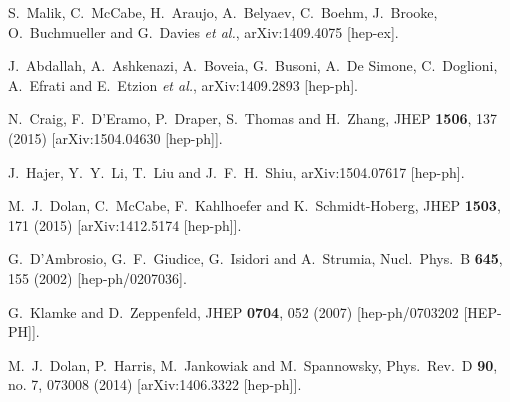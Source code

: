 \documentclass[preprintnumbers,superscriptaddress,nofootinbib,aps,prd,floatfix]{revtex4}
\begin{document}
\begin{thebibliography}{99}
  S.~Malik, C.~McCabe, H.~Araujo, A.~Belyaev, C.~Boehm, J.~Brooke, O.~Buchmueller and G.~Davies {\it et al.},
  arXiv:1409.4075 [hep-ex].

  J.~Abdallah, A.~Ashkenazi, A.~Boveia, G.~Busoni, A.~De Simone, C.~Doglioni, A.~Efrati and E.~Etzion {\it et al.},
  arXiv:1409.2893 [hep-ph].

  N.~Craig, F.~D'Eramo, P.~Draper, S.~Thomas and H.~Zhang,
  JHEP {\bf 1506}, 137 (2015)
  [arXiv:1504.04630 [hep-ph]].

  J.~Hajer, Y.~Y.~Li, T.~Liu and J.~F.~H.~Shiu,
  arXiv:1504.07617 [hep-ph].

  M.~J.~Dolan, C.~McCabe, F.~Kahlhoefer and K.~Schmidt-Hoberg,
  JHEP {\bf 1503}, 171 (2015)
  [arXiv:1412.5174 [hep-ph]].
    
  G.~D'Ambrosio, G.~F.~Giudice, G.~Isidori and A.~Strumia,
  Nucl.\ Phys.\ B {\bf 645}, 155 (2002)
  [hep-ph/0207036].

  G.~Klamke and D.~Zeppenfeld,
  JHEP {\bf 0704}, 052 (2007)
  [hep-ph/0703202 [HEP-PH]].

  M.~J.~Dolan, P.~Harris, M.~Jankowiak and M.~Spannowsky,
  Phys.\ Rev.\ D {\bf 90}, no. 7, 073008 (2014)
  [arXiv:1406.3322 [hep-ph]].


\end{thebibliography}
\end{document}
